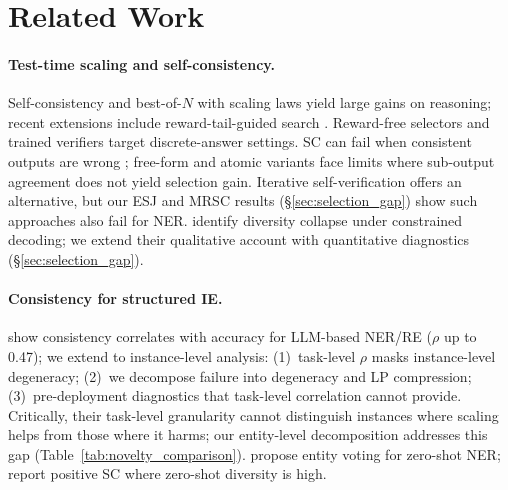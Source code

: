 \section{Related Work}\label{sec:related}

\paragraph{Test-time scaling and self-consistency.}\label{sec:yun_contrast}
Self-consistency \cite{wang2023selfconsistency} and best-of-$N$ with scaling laws \cite{snell2025scaling, brown2024monkeys, gao2023scaling} yield large gains on reasoning; recent extensions include reward-tail-guided search \cite{li2026rewardtail}. Reward-free selectors \cite{taubenfeld2025cisc, kang2025selfcertainty} and trained verifiers \cite{cobbe2021verifiers, lightman2024verify, li2023stepaware} target discrete-answer settings.
SC can fail when consistent outputs are wrong \cite{chen2023twofailures}; free-form \cite{chen2024usc} and atomic \cite{thirukovalluru2024atomic} variants face limits where sub-output agreement does not yield selection gain. Iterative self-verification \cite{shinn2023reflexion} offers an alternative, but our ESJ and MRSC results (\S\ref{sec:selection_gap}) show such approaches also fail for NER.
\citet{yun2025price} identify diversity collapse under constrained decoding; we extend their qualitative account with quantitative diagnostics (\S\ref{sec:selection_gap}).

\paragraph{Consistency for structured IE.}
\citet{yao2026consistency} show consistency correlates with accuracy for LLM-based NER/RE ($\rho$ up to 0.47); we extend to instance-level analysis: (1)~task-level $\rho$ masks instance-level degeneracy; (2)~we decompose failure into degeneracy and LP compression; (3)~pre-deployment diagnostics that task-level correlation cannot provide.
Critically, their task-level granularity cannot distinguish instances where scaling helps from those where it harms; our entity-level decomposition addresses this gap (Table~\ref{tab:novelty_comparison}).
\citet{xie2023zeroshot} propose entity voting for zero-shot NER; \citet{xie2024selfimproving} report positive SC where zero-shot diversity is high.

